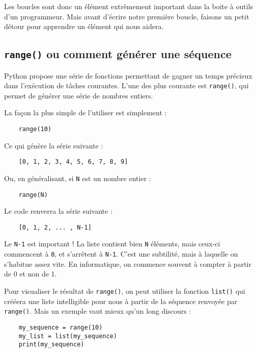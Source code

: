 Les boucles sont donc un élément extrêmement important dans la boite à outils d'un programmeur. Mais avant d'écrire notre première boucle, faisons un petit détour pour apprendre un élément qui nous aidera.

\subsection{\texttt{range()} ou comment générer une séquence}

Python propose une série de fonctions permettant de gagner un temps précieux dans l'exécution de tâches courantes. L'une des plus courante est \texttt{range()}, qui permet de générer une série de nombres entiers.

La façon la plus simple de l'utiliser est simplement :

\begin{lstlisting}
    range(10)
\end{lstlisting}

Ce qui génère la série suivante :

\begin{lstlisting}
    [0, 1, 2, 3, 4, 5, 6, 7, 8, 9]
\end{lstlisting}

Ou, en généralisant, si \texttt{N} est un nombre entier :

\begin{lstlisting}
    range(N)
\end{lstlisting}

Le code renverra la série suivante :

\begin{lstlisting}
    [0, 1, 2, ... , N-1]
\end{lstlisting}

Le \texttt{N-1} est important ! La liste contient bien \texttt{N} éléments, mais ceux-ci commencent à \texttt{0}, et s'arrêtent à \texttt{N-1}. C'est une subtilité, mais à laquelle on s'habitue assez vite. En informatique, on commence souvent à compter à partir de 0 et non de 1.

Pour visualiser le résultat de \texttt{range()}, on peut utiliser la fonction \texttt{list()} qui crééera une liste intelligible pour nous à partir de la séquence renvoyée par \texttt{range()}. Mais un exemple vaut mieux qu'un long discours :

\begin{lstlisting}
    my_sequence = range(10)
    my_list = list(my_sequence)
    print(my_sequence)
\end{lstlisting}

